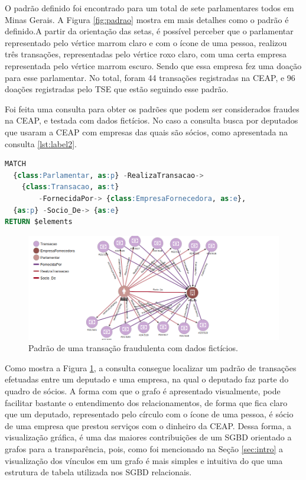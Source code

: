 \documentclass[12pt]{article}
\begin{document}
O padrão definido foi encontrado para um total de sete parlamentares todos em Minas Gerais. A Figura \ref{fig:padrao} mostra em mais detalhes como o padrão é definido.A partir da orientação das setas, é possível perceber que o parlamentar representado pelo vértice marrom claro e com o ícone de uma pessoa, realizou três transações, representadas pelo vértice roxo claro, com uma certa empresa representada pelo vértice marrom escuro. Sendo que essa empresa fez uma doação para esse parlamentar. No total, foram 44 transações registradas na CEAP, e 96 doações registradas pelo TSE que estão seguindo esse padrão.

Foi feita uma consulta para obter os padrões que podem ser considerados fraudes na CEAP, e testada com dados fictícios. No caso a consulta busca por deputados que usaram a CEAP com empresas das quais são sócios, como apresentada na consulta \ref{lst:label2}.

\begin{lstlisting}[label={lst:label2}, caption={Consulta de relacionamento de uso da CEAP entre deputados e empresas nas quais o deputado é sócio.},captionpos=b, language=sql]
MATCH 
  {class:Parlamentar, as:p} -RealizaTransacao-> 
  	{class:Transacao, as:t} 
    	-FornecidaPor-> {class:EmpresaFornecedora, as:e},
  {as:p} -Socio_De-> {as:e}
RETURN $elements
\end{lstlisting}

\begin{figure}[ht]
\centering
\includegraphics[width=.85\textwidth]{socios.png}
\caption{Padrão de uma transação fraudulenta com dados fictícios.}
\label{fig:socios}
\end{figure}

Como mostra a Figura \ref{fig:socios}, a consulta consegue localizar um padrão de transações efetuadas entre um deputado e uma empresa, na qual o deputado faz parte do quadro de sócios. A forma com que o grafo é apresentado visualmente, pode facilitar bastante o entendimento dos relacionamentos, de forma que fica claro que um deputado, representado pelo círculo com o ícone de uma pessoa, é sócio de uma empresa que prestou serviços com o dinheiro da CEAP. Dessa forma, a visualização gráfica, é uma das maiores contribuições de um SGBD orientado a grafos para a transparência, pois, como foi mencionado na Seção \ref{sec:intro} a visualização dos vínculos em um grafo é mais simples e intuitiva do que uma estrutura de tabela utilizada nos SGBD relacionais.
\end{document}
